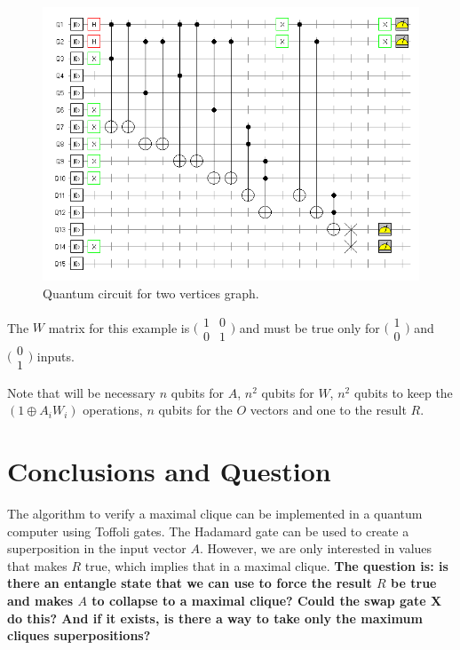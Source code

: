 \documentclass[a4paper,12pt]{article}
\begin{document}
\begin{figure}[!ht]
	\label{fig:qcircuit}
	\centering
	\includegraphics[width=1\textwidth]{qclique}
	\caption{Quantum circuit for two vertices graph.}
\end{figure}

The $W$ matrix for this example is $\bigl(\begin{smallmatrix}
1&0 \\ 0&1 \end{smallmatrix} \bigr)$ and must be true only for $\bigl(\begin{smallmatrix} 1\\0 \end{smallmatrix} \bigr)$ and $\bigl(\begin{smallmatrix} 0\\1 \end{smallmatrix} \bigr)$ inputs.

Note that will be necessary $n$ qubits for $A$, $n^2$ qubits for $W$, $n^2$ qubits to keep the $(1 \oplus A_i W_i)$ operations, $n$ qubits for the $O$ vectors and one to the result $R$.

\section{Conclusions and Question}

The algorithm to verify a maximal clique can be implemented in a quantum computer using Toffoli gates. The Hadamard gate can be used to create a superposition in the input vector $A$. However, we are only interested in values that makes $R$ true, which implies that in a maximal clique. \textbf{The question is: is there an entangle state that we can use to force the result $R$ be true and makes $A$ to collapse to a maximal clique? Could the swap gate X do this? And if it exists, is there a way to take only the maximum cliques superpositions?}
\end{document}
